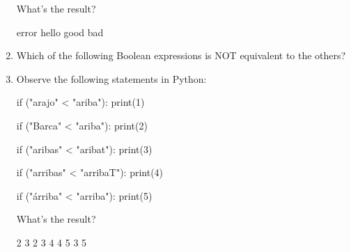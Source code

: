 \begin{enumerate}
What's the result?

\begin{choices}
    \choice error
    \choice hello
    \choice good %
    \choice bad
\end{choices}


\item Which of the following Boolean expressions is NOT equivalent to the others?

\begin{choices}
    \choice {} %
    \choice  {}
    \choice {}
    \choice {}
\end{choices}




\item Observe the following statements in Python:
\begin{python}
if ("arajo" < "ariba"):
    print(1)
    
if ("Barca" < "ariba"):
    print(2)
    
if ("aribas" < "aribat"):
    print(3)

if ("arribas" < "arribaT"):
    print(4)
    
if ("árriba" < "arriba"):
    print(5)
\end{python}

What's the result?


\begin{choices}
     2 3 %
     2 3 4
     4 5
     3 5
\end{choices}

\end{enumerate}
